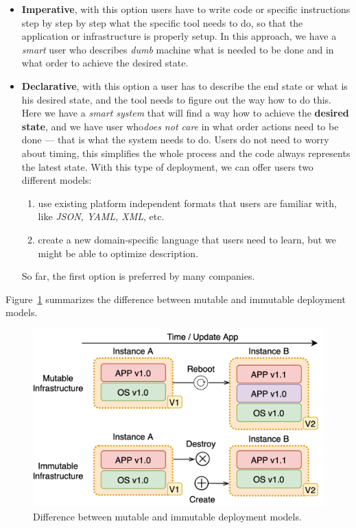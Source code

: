 \begin{itemize}\label{lab:dep_types}
	\item \textbf{Imperative}, with this option users have to write code or specific instructions step by step by step what the specific tool needs to do, so that the application or infrastructure is properly setup. In this approach, we have a \textit{smart} user who describes \textit{dumb} machine what is needed to be done and in what order to achieve the desired state.
	\item \textbf{Declarative}, with this option a user has to describe the end state or what is his desired state, and the tool needs to figure out the way how to do this. Here we have a \textit{smart system} that will find a way how to achieve the \textbf{desired state}, and we have user who\textit{does not care} in what order actions need to be done --- that is what the system needs to do. Users do not need to worry about timing, this simplifies the whole process and the code always represents the latest state. With this type of deployment, we can offer users two different models: 
	
	\begin{enumerate}[start=1,label={(\bfseries \arabic*)}]
		\item use existing platform independent formats that users are familiar with, like \textit{JSON, YAML, XML}, etc.
		\item create a new domain-specific language that users need to learn, but we might be able to optimize description.
	\end{enumerate}
	
	So far, the first option is preferred by many companies.
\end{itemize}

\noindent
Figure~\ref{fig:fig12} summarizes the difference between mutable and immutable deployment models.

\begin{figure}[H]
	\begin{center}
		\includegraphics[scale=0.9]{images/Figure12.png}
	\end{center}
	\vspace{-0.6cm}
	\caption{Difference between mutable and immutable deployment models.}
	\label{fig:fig12}
\end{figure}

